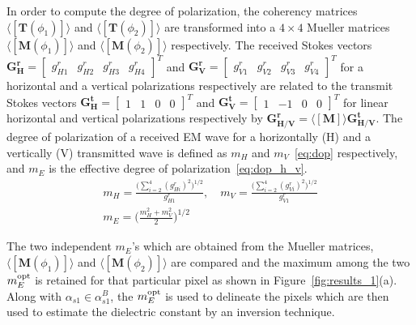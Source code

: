 In order to compute the degree of polarization, the coherency matrices $\langle[{\mathbf{T}}(\phi_1)]\rangle$ and $\langle[{\mathbf{T}}(\phi_2)]\rangle$ are transformed into a $4\times4$ Mueller matrices $\langle[{\mathbf{M}}(\phi_1)]\rangle$ and $\langle[{\mathbf{M}}(\phi_2)]\rangle$ respectively. The received Stokes vectors $\mathbf{G_{H}^{r}}=\begin{bmatrix} g_{H1}^{r} & g_{H2}^{r} & g_{H3}^{r} & g_{H4}^{r}
\end{bmatrix}^{T}$ and $\mathbf{G_{V}^{r}}=\begin{bmatrix}
g_{V1}^{r} & g_{V2}^{r} & g_{V3}^{r} & g_{V4}^{r}
\end{bmatrix}^T$ for a horizontal and a vertical  polarizations respectively are related to the
transmit Stokes vectors $\mathbf{G_{H}^{t}} = \begin{bmatrix}
1 & 1 & 0 & 0
\end{bmatrix}^T$ and $\mathbf{G_{V}^{t}} = \begin{bmatrix}
1 & {-1} & 0 & 0
\end{bmatrix}^T$ for linear horizontal and vertical polarizations respectively by $\mathbf{G_{H/V}^{r}}=\mathbf{\langle[M]\rangle}\mathbf{G_{H/V}^{t}}$. The degree of polarization of a received EM wave for a horizontally (H) and a vertically (V) transmitted wave is defined as $m_{H}$ and $m_{V}$~\eqref{eq:dop} respectively, and $m_{E}$ is the effective degree of polarization~\eqref{eq:dop_h_v}.
\begin{gather}
m_{H} = \frac{\Big(\sum_{i=2}^{4}({g_{Hi}^{r}})^2 \Big)^{1/2}}{g_{H1}^{r}},\quad\label{eq:dop}
m_{V} = \frac{\Big(\sum_{i=2}^{4}({g_{Vi}^{r}})^2 \Big)^{1/2}}{g_{V1}^{r}}\\[0.1em] 
m_{E} = \Bigg(\frac{m_{H}^{2}+m_{V}^{2}}{2}\Bigg)^{1/2}
\label{eq:dop_h_v}
\end{gather}

The two independent $m_{E}$'s which are obtained from the Mueller matrices, $\langle[{\mathbf{M}}(\phi_1)]\rangle$ and $\langle[{\mathbf{M}}(\phi_2)]\rangle$ are compared and the maximum among the two $m_{E}^{\mbox{\scriptsize opt}}$ is retained for that particular pixel as shown in Figure~\ref{fig:results_1}(a). Along with $\alpha_{s1} \in \alpha_{s1}^{B}$, the $m_{E}^{\mbox{\scriptsize opt}}$ is used to delineate the pixels which are then used to estimate the dielectric constant by an inversion technique.
